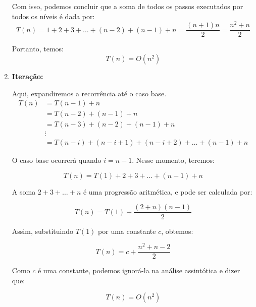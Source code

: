 \begin{enumerate}
	      \FloatBarrier

	      Com isso, podemos concluir que a soma de todos os passos executados por todos os níveis é dada por:
	      \[
		      T(n) = 1 + 2 + 3 + \ldots + (n - 2) + (n - 1) + n = \frac{(n + 1) n}{2} = \frac{n^2 + n}{2}
	      \]

	      Portanto, temos:
	      \[
		      T(n) = O(n^2)
	      \]

	\item \textbf{Iteração:}

	      Aqui, expandiremos a recorrência até o caso base.
	      \begin{align*}
		      T(n) & = T(n-1) + n                                               \\
		           & = T(n-2) + (n - 1) + n                                     \\
		           & = T(n-3) + (n - 2) + (n - 1) + n                           \\
		           & \vdots                                                     \\
		           & = T(n-i) + (n - i + 1) + (n - i + 2) + \dots + (n - 1) + n
	      \end{align*}

	      O caso base ocorrerá quando \( i = n - 1 \). Nesse momento, teremos:

	      \[
		      T(n) = T(1) + 2 + 3 + \dots + (n - 1) + n
	      \]

	      A soma \( 2 + 3 + \dots + n \) é uma progressão aritmética, e pode ser calculada por:

	      \[
		      T(n) = T(1) + \frac{(2 + n)(n - 1)}{2}
	      \]

	      Assim, substituindo \( T(1) \) por uma constante \( c \), obtemos:

	      \[
		      T(n) = c + \frac{n^2 + n - 2}{2}
	      \]

	      Como \( c \) é uma constante, podemos ignorá-la na análise assintótica e dizer que:

	      \[
		      T(n) = O(n^2)
	      \]


\end{enumerate}







